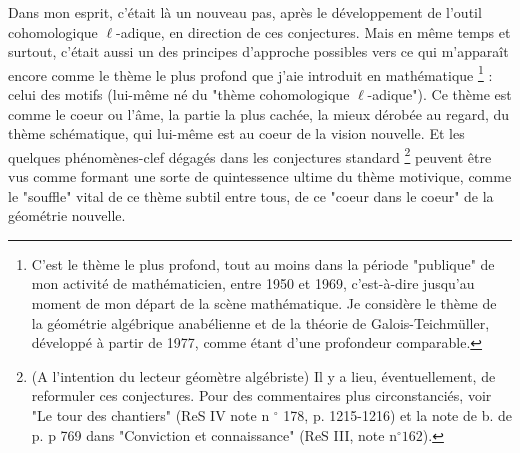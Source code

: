 Dans mon esprit, c'était là un nouveau pas, après le développement de l'outil cohomologique $\ell$-adique, en direction de ces conjectures. Mais en même temps et surtout, c'était aussi un des principes d'approche possibles vers ce qui m'apparaît encore comme le thème le plus profond que j'aie introduit en mathématique \footnote{C'est le thème le plus profond, tout au moins dans la période "publique" de mon activité de mathématicien, entre 1950 et 1969, c'est-à-dire jusqu'au moment de mon départ de la scène mathématique. Je considère le thème de la géométrie algébrique anabélienne et de la théorie de Galois-Teichmüller, développé à partir de 1977, comme étant d'une profondeur comparable.} : celui des motifs (lui-même né du "thème cohomologique $\ell$-adique"). Ce thème est comme le coeur ou l'âme, la partie la plus cachée, la mieux dérobée au regard, du thème schématique, qui lui-même est au coeur de la vision nouvelle. Et les quelques phénomènes-clef dégagés dans les conjectures standard \footnote{(A l'intention du lecteur géomètre algébriste) Il y a lieu, éventuellement, de reformuler ces conjectures. Pour des commentaires plus circonstanciés, voir "Le tour des chantiers" (ReS IV note n ${ }^{\circ}$ 178, p. 1215-1216) et la note de b. de p. p 769 dans "Conviction et connaissance" (ReS III, note $\mathrm{n}^{\circ} 162$).} peuvent être vus comme formant une sorte de quintessence ultime du thème motivique, comme le "souffle" vital de ce thème subtil entre tous, de ce "coeur dans le coeur" de la géométrie nouvelle.

